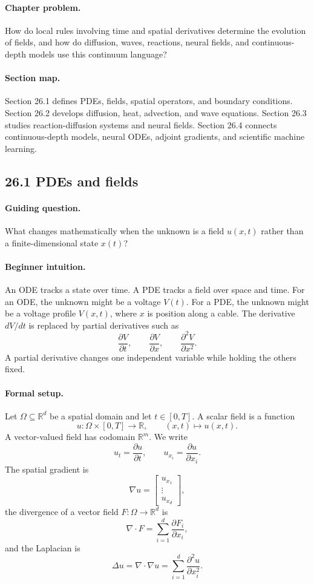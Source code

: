 \paragraph{Chapter problem.}
How do local rules involving time and spatial derivatives determine the evolution of fields, and how do diffusion, waves, reactions, neural fields, and continuous-depth models use this continuum language?

\paragraph{Section map.}
Section 26.1 defines PDEs, fields, spatial operators, and boundary conditions. Section 26.2 develops diffusion, heat, advection, and wave equations. Section 26.3 studies reaction-diffusion systems and neural fields. Section 26.4 connects continuous-depth models, neural ODEs, adjoint gradients, and scientific machine learning.

\subsection{26.1 PDEs and fields}

\paragraph{Guiding question.}
What changes mathematically when the unknown is a field \(u(x,t)\) rather than a finite-dimensional state \(x(t)\)?

\paragraph{Beginner intuition.}
An ODE tracks a state over time. A PDE tracks a field over space and time. For an ODE, the unknown might be a voltage \(V(t)\). For a PDE, the unknown might be a voltage profile \(V(x,t)\), where \(x\) is position along a cable. The derivative \(dV/dt\) is replaced by partial derivatives such as
\[
\frac{\partial V}{\partial t},
\qquad
\frac{\partial V}{\partial x},
\qquad
\frac{\partial^2 V}{\partial x^2}.
\]
A partial derivative changes one independent variable while holding the others fixed.

\paragraph{Formal setup.}
Let \(\Omega\subseteq\mathbb{R}^d\) be a spatial domain and let \(t\in[0,T]\). A scalar field is a function
\[
u:\Omega\times[0,T]\to\mathbb{R},
\qquad
(x,t)\mapsto u(x,t).
\]
A vector-valued field has codomain \(\mathbb{R}^m\). We write
\[
u_t=\frac{\partial u}{\partial t},
\qquad
u_{x_i}=\frac{\partial u}{\partial x_i}.
\]
The spatial gradient is
\[
\nabla u=\begin{bmatrix}u_{x_1}\\ \vdots\\ u_{x_d}\end{bmatrix},
\]
the divergence of a vector field \(F:\Omega\to\mathbb{R}^d\) is
\[
\nabla\cdot F=\sum_{i=1}^d\frac{\partial F_i}{\partial x_i},
\]
and the Laplacian is
\[
\Delta u=\nabla\cdot\nabla u=\sum_{i=1}^d\frac{\partial^2u}{\partial x_i^2}.
\]

